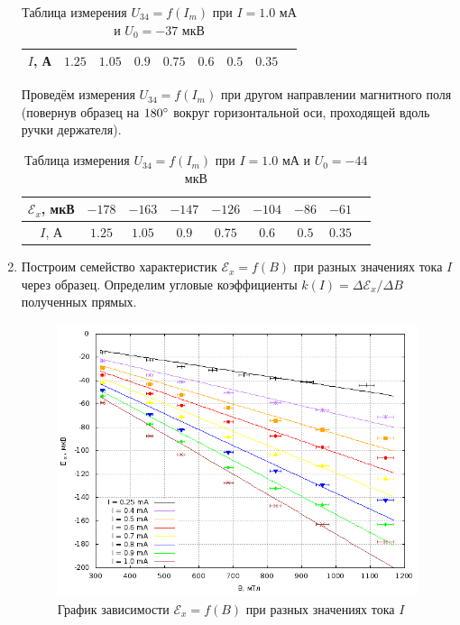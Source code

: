 \documentclass[12pt]{article}
\begin{document}
\begin{enumerate}
\begin{table}[h!]
\begin{tabular}{|c|c|c|c|c|c|c|c|c|}
		\hline
			$I$, А & $1.25$ & $1.05$ & $0.9$ & $0.75$ & $0.6$ & $0.5$ & $0.35$ \\
		\hline	
		\end{tabular}
		\caption{Таблица измерения $U_\text{34} = f(I_m)$ при $I = 1.0$ мА и $U_0 = -37 $ мкВ}
	\end{table}
\par
	Проведём измерения $U_\text{34} = f(I_m)$ при другом направлении магнитного поля (повернув образец на $180 \degree$ вокруг горизонтальной оси, проходящей вдоль ручки держателя).
	\begin{table}[h!]
		\centering
		\begin{tabular}{|c|c|c|c|c|c|c|c|c|}
		\hline
			$\mathscr{E}_x$, мкВ & $-178$ & $-163$ & $-147$ & $-126$ & $-104$ & $-86$ & $-61$ \\
		\hline
			$I$, А & $1.25$ & $1.05$ & $0.9$ & $0.75$ & $0.6$ & $0.5$ & $0.35$ \\
		\hline	
		\end{tabular}
		\caption{Таблица измерения $U_\text{34} = f(I_m)$ при $I = 1.0$ мА и $U_0 = -44 $ мкВ}
	\end{table}
\item
	Построим семейство характеристик $\mathscr{E}_x = f(B) $ при разных значениях тока $I$ через образец. Определим угловые коэффициенты $k(I) = \Delta \mathscr{E}_x / \Delta B$ полученных прямых.
	\newpage
	\begin{figure}[h!]
		\centering
		\includegraphics[height = 8cm, width = 15cm]{plot2.png}
		\caption{График зависимости $\mathscr{E}_x = f(B)$ при разных значениях тока $I$}
	\end{figure}
	\begin{table}[h!]
		\centering
		\begin{tabular}{|c|c|c|}
		\hline

\end{tabular}
\end{table}
\end{enumerate}
\end{document}
